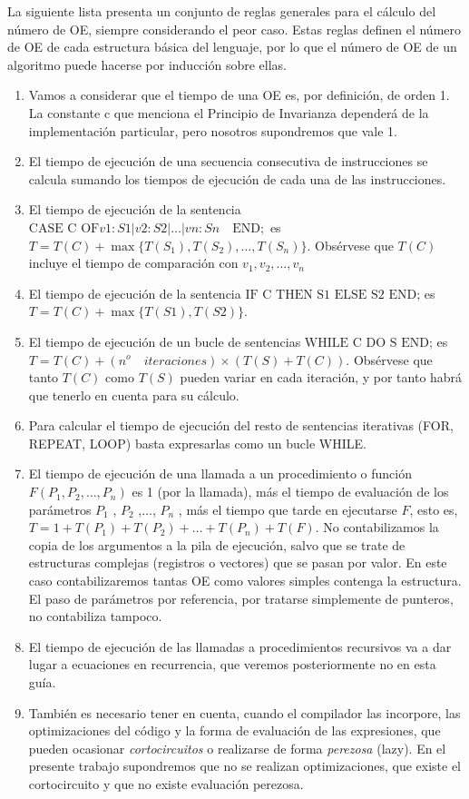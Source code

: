 La siguiente lista presenta un conjunto de reglas generales para el cálculo del
número de OE, siempre considerando el peor caso. Estas reglas definen el número
de OE de cada estructura básica del lenguaje, por lo que el número de OE de un
algoritmo puede hacerse por inducción sobre ellas.

\begin{enumerate}
	\item Vamos a considerar que el tiempo de una OE es, por definición, de orden 1. La
constante c que menciona el Principio de Invarianza dependerá de la
implementación particular, pero nosotros supondremos que vale 1.
	\item El tiempo de ejecución de una secuencia consecutiva de instrucciones se calcula
sumando los tiempos de ejecución de cada una de las instrucciones.
	\item El tiempo de ejecución de la sentencia  $\text{CASE C OF} v1:S1|v2:S2|\dots|vn:Sn\quad
	 \text{END};$ es $T = T(C) + \max\{T(S_1 ),T(S_2 ),\dots,T(S_n)\}$. Obsérvese que $T(C)$ incluye el
	tiempo de comparación con $v_1 , v_2 ,\dots, v_n$ 
	\item El tiempo de ejecución de la sentencia $\text{IF C THEN S1 ELSE S2 END;}$ es \\
	$T = T(C) + \max\{T(S 1 ),T(S 2 )\}$.
	\item El tiempo de ejecución de un bucle de sentencias $\text{WHILE C DO S END;}$ es
	$T = T(C) + (n^o \quad iteraciones)\times(T(S) + T(C))$. Obsérvese que tanto $T(C)$ como $T(S)$
pueden variar en cada iteración, y por tanto habrá que tenerlo en cuenta para su
cálculo.
	\item Para calcular el tiempo de ejecución del resto de sentencias iterativas (FOR,
	REPEAT, LOOP) basta expresarlas como un bucle WHILE.
	\item El tiempo de ejecución de una llamada a un procedimiento o función
	$F(P_1 , P_2 ,\dots, P_n )$ es 1 (por la llamada), más el tiempo de evaluación de los
	parámetros $P_1$ , $P_2$ ,$\dots$, $P_n$ , más el tiempo que tarde en ejecutarse $F$, esto es,
	$T = 1 + T(P_1 ) + T(P_2 ) + \dots + T(P_n ) + T(F)$. No contabilizamos la copia de los
argumentos a la pila de ejecución, salvo que se trate de estructuras complejas
(registros o vectores) que se pasan por valor. En este caso contabilizaremos
tantas OE como valores simples contenga la estructura. El paso de parámetros
por referencia, por tratarse simplemente de punteros, no contabiliza tampoco.
	\item El tiempo de ejecución de las llamadas a procedimientos recursivos va a dar
lugar a ecuaciones en recurrencia, que veremos posteriormente no en esta guía.
	\item También es necesario tener en cuenta, cuando el compilador las incorpore, las
optimizaciones del código y la forma de evaluación de las expresiones, que
pueden ocasionar \emph{cortocircuitos} o realizarse de forma \emph{perezosa} (lazy). En el
presente trabajo supondremos que no se realizan optimizaciones, que existe el
cortocircuito y que no existe evaluación perezosa.
\end{enumerate}

